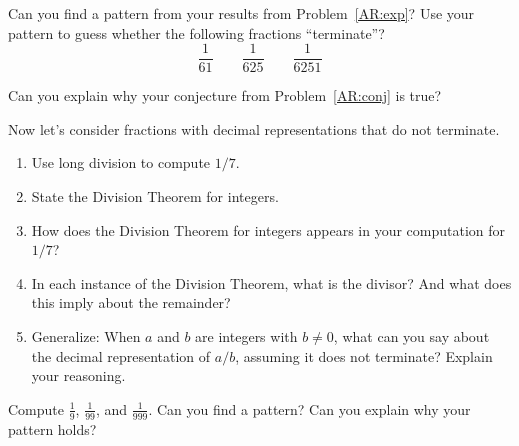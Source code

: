 \documentclass{ximera}
\begin{document}

\begin{problem}\label{AR:conj}
Can you find a pattern from your results from Problem~\ref{AR:exp}?
Use your pattern to guess whether the following fractions
``terminate''?  
\[
\dfrac{1}{61}\qquad \dfrac{1}{625} \qquad \dfrac{1}{6251}
\]
\end{problem}


\begin{problem}
Can you explain why your conjecture from Problem~\ref{AR:conj} is true?
\end{problem}

\begin{problem} Now let's consider fractions with decimal representations that do not terminate.  
\begin{enumerate}
\item Use long division to compute $1/7$.
\item {}
State the Division Theorem for integers.
\item How does the Division Theorem for integers appears in your computation for $1/7$?
\item In each instance of the Division Theorem, what 
is the divisor? And what does this imply about the remainder?
\item Generalize:  When $a$ and $b$ are integers with $b\ne 0$, 
what can you say about the decimal representation of $a/b$, assuming
it does not terminate?  Explain your reasoning.  
\end{enumerate}
\end{problem}

\begin{problem}\label{AR:nines} 
Compute $\frac{1}{9}$, $\frac{1}{99}$, and $\frac{1}{999}$. Can you
find a pattern? Can you explain why your pattern holds?
\end{problem}
\end{document}
